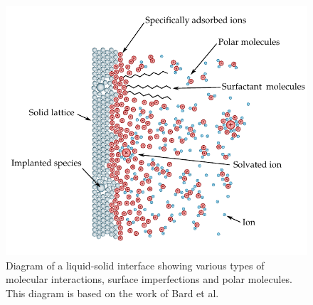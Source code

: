   \begin{figure}
    \begin{center}
      \includegraphics{content/introduction/graphics/interface}
    \end{center}
    \caption[Diagram of a liquid-solid interface showing various types of molecular interactions.]{Diagram of a liquid-solid interface showing various types of molecular interactions, surface imperfections and polar molecules. This diagram is based on the work of Bard et al. \cite{Bard1993}}
    \label{fig:interface}
  \end{figure}


